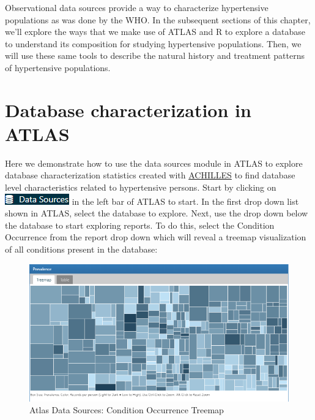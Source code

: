 \documentclass[11pt]{book}
\theoremstyle{definition}
\theoremstyle{definition}
\theoremstyle{definition}
\theoremstyle{remark}
\begin{document}
Observational data sources provide a way to characterize hypertensive populations as was done by the WHO. In the subsequent sections of this chapter, we'll explore the ways that we make use of ATLAS and R to explore a database to understand its composition for studying hypertensive populations. Then, we will use these same tools to describe the natural history and treatment patterns of hypertensive populations.

\hypertarget{database-characterization-in-atlas}{%
\section{Database characterization in ATLAS}\label{database-characterization-in-atlas}}

Here we demonstrate how to use the data sources module in ATLAS to explore database characterization statistics created with \href{https://github.com/OHDSI/Achilles}{ACHILLES} to find database level characteristics related to hypertensive persons. Start by clicking on \includegraphics{images/Characterization/atlasDataSourcesMenuItem.png} in the left bar of ATLAS to start. In the first drop down list shown in ATLAS, select the database to explore. Next, use the drop down below the database to start exploring reports. To do this, select the Condition Occurrence from the report drop down which will reveal a treemap visualization of all conditions present in the database:

\begin{figure}

{\centering \includegraphics[width=1\linewidth]{images/Characterization/atlasDataSourcesConditionTreemap} 

}

\caption{Atlas Data Sources: Condition Occurrence Treemap}\label{fig:atlasDataSourcesConditionTreemap}
\end{figure}
\end{document}
